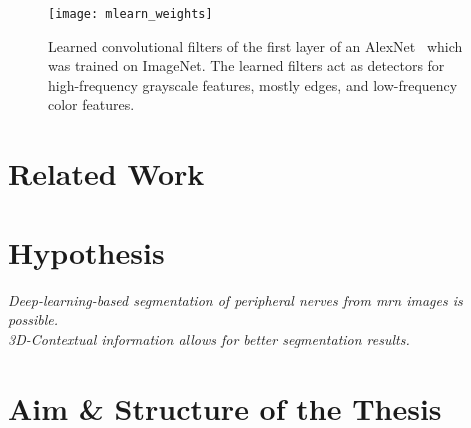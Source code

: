\begin{figure}[htbp]
    \centering
	\texttt{[image: mlearn\_weights]}
    \caption[Learned Weights of trained AlexNet]{Learned convolutional filters of the first layer of an AlexNet~\cite{Krizhevsky2012ImageNetNetworks} which was trained on ImageNet. The learned filters act as detectors for high-frequency grayscale features, mostly edges, and low-frequency color features.}
    \label{fig:mlearn_weights}
\end{figure}



\section{Related Work} %
\section{Hypothesis} %

\textit{Deep-learning-based segmentation of peripheral nerves from \gls{mrn} images is possible.} \\
\textit{3D-Contextual information allows for better segmentation results.}

\section{Aim \& Structure of the Thesis} %

\endinput
